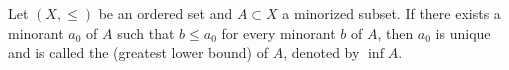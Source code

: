 Let $(X, \leq)$ be an ordered set and $A \subset X$ a minorized subset. If there exists a minorant $a_0$ of $A$ such that $b \leq a_0$ for every minorant $b$ of $A$, then $a_0$ is unique and is called the  (greatest lower bound) of $A$, denoted by $\inf A$.
